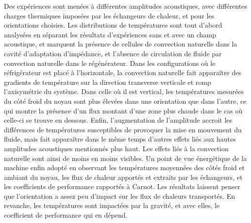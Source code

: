 Des expériences sont menées à différentes amplitudes acoustiques, avec différentes charges thermiques imposées par les échangeurs de chaleur, et pour les orientations choisies.  Les distributions de températures sont tout d'abord analysées en séparant les résultats d'expériences sans et avec un champ acoustique, et marquent la présence de cellules de convection naturelle dans la cavité d'adaptation d'impédance, et l'absence de circulation de fluide par convection naturelle dans le régénérateur. Dans les configurations où le réfrigérateur est placé à l'horizontale, la convection naturelle fait apparaître des gradients de température sur la direction transverse verticale et romp l'axisymétrie du système. Dans celle où il est vertical, les températures mesurées du côté froid du noyau sont plus élevées dans une orientation que dans l'autre, ce qui montre la présence d'un flux montant d'une zone plus chaude dans le cas où celle-ci se trouve en dessous. Enfin, l'augmentation de l'amplitude accroit les différences de températures susceptibles de provoquer la mise en mouvement du fluide, mais fait apparaître dans le même temps d'autres effets liés aux hautes amplitudes acoustiques mentionnés plus haut. Les effets liés à la convection naturelle sont ainsi de moins en moins visibles. Un point de vue énergétique de la machine enfin adopté en observant les températures moyennées des côtés froid et ambiant du noyau, les flux de chaleur apportés et extraits par les échangeurs, et les coefficients de performance rapportés à Carnot. Les résultats laissent penser que l'orientation a assez peu d'impact sur les flux de chaleurs transportés. En revanche, les températures sont impactées par la gravité, et avec elles, le coefficient de performance qui en dépend.
%
%
%
%
%
